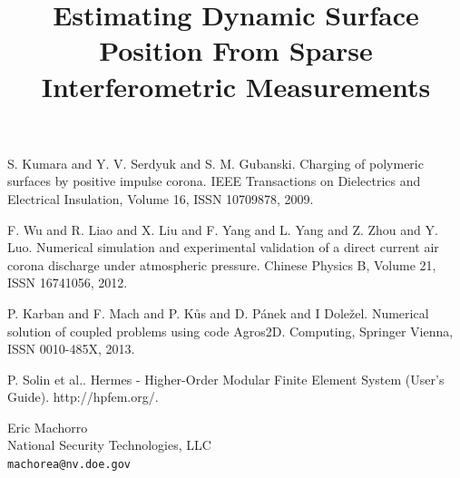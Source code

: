 \documentclass[article,A4,11pt]{llncs}%
\begin{document}

\begin{thebibliography}{10}
{\sc S. Kumara and Y. V. Serdyuk and S. M. Gubanski}. {Charging of polymeric surfaces by positive impulse corona}. IEEE Transactions on Dielectrics and Electrical Insulation, Volume 16, ISSN 10709878, 2009.

{\sc F. Wu and R. Liao and X. Liu and F. Yang and L. Yang and Z. Zhou and Y. Luo}. {Numerical simulation and experimental validation of a direct current air corona discharge under atmospheric pressure}. Chinese Physics B, Volume 21, ISSN 16741056, 2012.

{\sc P. Karban and F. Mach and P. K\r{u}s and D. P\'{a}nek and I Dole\v{z}el}. {Numerical solution of coupled problems using code Agros2D}. Computing, Springer Vienna, ISSN 0010-485X, 2013.

{\sc P. Solin et al.}. {Hermes - Higher-Order Modular Finite Element System (User's Guide)}. http://hpfem.org/.
\end{thebibliography}

\title{Estimating Dynamic Surface Position From Sparse Interferometric Measurements}
 \author{} \institute{}
\maketitle
\begin{center}
{\large Eric Machorro}\\
National Security Technologies, LLC\\
{\tt machorea@nv.doe.gov}
\end{center}
\end{document}

